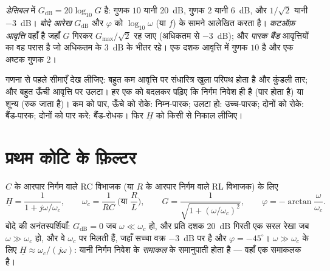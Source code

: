 \begin{definition}[डेसिबल; बोदे आरेख]\label{def:b1:filters-transfer-functions:bode}
\emph{डेसिबल} में  $G_{\mathrm{dB}} = 20\log_{10}G$ है: गुणक
$10$ यानी \qty{20}{dB}, गुणक $2$ यानी \qty{6}{dB}, और $1/\sqrt2$ यानी
\qty{-3}{dB}। \emph{बोदे आरेख} $G_{\mathrm{dB}}$ और
$\varphi$ को $\log_{10}\omega$ (या $f$) के सामने आलेखित करता है।
\emph{कटऑफ़ आवृत्ति} वहाँ है जहाँ $G$ गिरकर $G_{\max}/\sqrt2$ रह जाए
(अधिकतम से \qty{-3}{dB}); और \emph{पारक बैंड} आवृत्तियों का वह परास है जो
अधिकतम के \qty{3}{dB} के भीतर रहे। एक दशक आवृत्ति में गुणक $10$ है और
एक अष्टक गुणक $2$।
\end{definition}

\begin{method}[एक नज़र में फ़िल्टर की प्रकृति]\label{met:b1:filters-transfer-functions:nature}
गणना से पहले सीमाएँ देख लीजिए: बहुत कम आवृत्ति पर संधारित्र
खुला परिपथ होता है और कुंडली तार; और बहुत ऊँची आवृत्ति पर उलटा। हर एक को
बदलकर पढ़िए कि निर्गम निवेश ही है
(पार होता है) या शून्य (रुक जाता है)। कम को पार, ऊँचे को रोके: निम्न-पारक;
उलटा हो: उच्च-पारक; दोनों को रोके: बैंड-पारक; दोनों को पार करे: बैंड-रोधक।
फिर $\underline H$ को किसी  से निकाल लीजिए।
\end{method}

\section{प्रथम कोटि के फ़िल्टर}

\begin{proposition}[प्रथम कोटि का निम्न-पारक]\label{prop:b1:filters-transfer-functions:lowpass1}
$C$ के आरपार निर्गम वाले RC विभाजक (या $R$ के आरपार निर्गम वाले RL
विभाजक) के लिए
\[
\underline H = \frac{1}{1 + j\omega/\omega_c}, \qquad
\omega_c = \frac{1}{RC} \ \Big(\text{या } \frac{R}{L}\Big),
\qquad G = \frac{1}{\sqrt{1 + (\omega/\omega_c)^2}}, \qquad
\varphi = -\arctan\frac{\omega}{\omega_c} .
\]
बोदे की अनंतस्पर्शियाँ: $G_{\mathrm{dB}} = 0$ जब $\omega \ll \omega_c$ हो, और
प्रति दशक \qty{20}{dB} गिरती एक सरल रेखा जब $\omega \gg \omega_c$ हो,
और वे $\omega_c$ पर मिलती हैं, जहाँ सच्चा वक्र \qty{-3}{dB} पर है और
$\varphi = -45^\circ$। $\omega \gg \omega_c$ के लिए $\underline H \approx
\omega_c/(j\omega)$: यानी निर्गम निवेश के \emph{समाकल} के समानुपाती होता है
--- वहाँ  एक समाकलक है।
\end{proposition}

